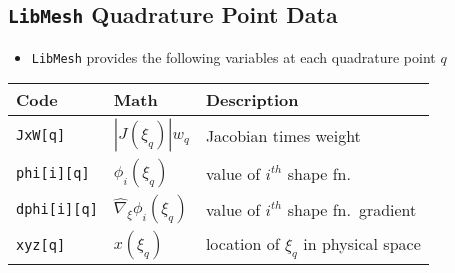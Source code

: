 \subsection*{\texttt{LibMesh} Quadrature Point Data}
\begin{frame}[t]
	\begin{block}{}
	\begin{itemize}    
	\item{ \texttt{LibMesh} provides the following variables at
	  each quadrature point $q$
	}
	\end{itemize}
	\end{block}
	
	\begin{center}
	  \renewcommand{\arraystretch}{1.3}
	\begin{tabular}{|l|l|l|} \hline
	  \textbf{Code} & \textbf{Math} & \textbf{Description} \\ \hline
	  \texttt{JxW[q]}
	  & $|J(\xi_q)| w_q$
	  & Jacobian times weight
	  \\ \hline
	  \texttt{phi[i][q]}
	  & $\phi_i(\xi_{q})$
	  & value of $i^{th}$ shape fn.\
	  \\ \hline
	  \texttt{dphi[i][q]}
	  & $\hat{\nabla}_{\!\xi} \phi_i (\xi_q)$
	  & value of $i^{th}$ shape fn.\ gradient
	  \\ \hline
	  \texttt{xyz[q]}
	  & $x(\xi_q)$
	  & location of $\xi_q$ in physical space
	  \\ \hline
	  \end{tabular}
	\end{center}
	  
\end{frame}
